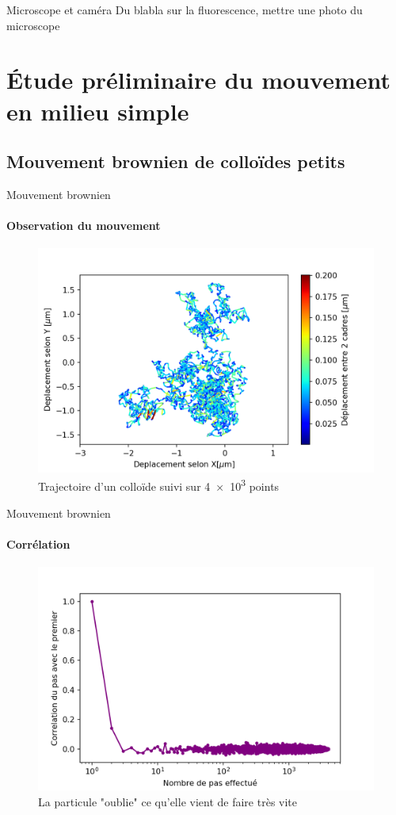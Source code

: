 \documentclass[11pt]{beamer}
\begin{document}
\begin{frame}{Microscope et caméra}
	Du blabla sur la fluorescence, mettre une photo du microscope
\end{frame}

\section{Étude préliminaire du mouvement en milieu simple}


\subsection{Mouvement brownien de colloïdes petits}
\begin{frame}{Mouvement brownien}
\framesubtitle{Observation du mouvement}
	\begin{figure}
		\centering
		\includegraphics[width=0.9\linewidth]{Trajectory_brownian}
		\caption{Trajectoire d'un colloïde suivi sur \num{4e3} points}
		\label{fig:trajectory_b}
	\end{figure}
\end{frame}

\begin{frame}{Mouvement brownien}
\framesubtitle{Corrélation}
	\begin{figure}
		\centering
		\includegraphics[width=0.9\linewidth]{Correlation_brownian}
		\caption{La particule "oublie" ce qu'elle vient de faire très vite}
		\label{fig:correl_b}
	\end{figure}
\end{frame}
\end{document}
